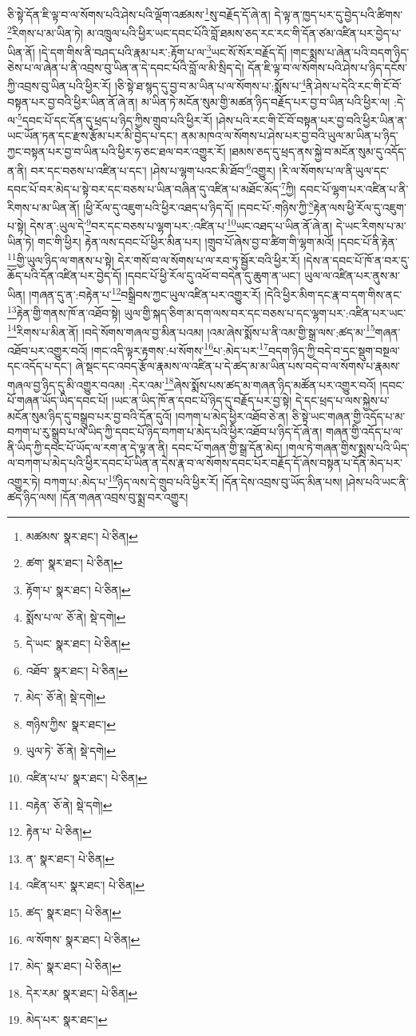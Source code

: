 ཅི་སྟེ་དོན་ཇི་ལྟ་བ་ལ་སོགས་པའི་ཤེས་པའི་ལྡོག་འཚམས་\footnote{མཚམས་  སྣར་ཐང་།  པེ་ཅིན། }སུ་བརྗོད་དོ་ཞེ་ན། དེ་ལྟ་ན་ཁྱད་པར་དུ་བྱེད་པའི་ཚིགས་\footnote{ཚག་  སྣར་ཐང་།  པེ་ཅིན། }རིགས་པ་མ་ཡིན་ཏེ། མ་འཁྲུལ་པའི་ཕྱིར་ཡང་དབང་པོའི་བློ་ཐམས་ཅད་རང་རང་གི་དོན་ཙམ་འཛིན་པར་བྱེད་པ་ཡིན་ནོ། །དེ་དག་གིས་ནི་བཤད་པའི་རྣམ་པར་:རྟོག་པ་ལ་\footnote{རྟོག་པ་  སྣར་ཐང་།  པེ་ཅིན། }ཡང་སོ་སོར་བརྗོད་དོ། །གང་སྨྲས་པ་ཞེན་པའི་བདག་ཉིད་ཅེས་པ་ལ་ཞེན་པ་ནི་འབྲས་བུ་ཡིན་ན་དེ་དབང་པོའི་བློ་ལ་མི་སྲིད་དེ། དོན་ཇི་ལྟ་བ་ལ་སོགས་པའི་ཤེས་པ་ཉིད་དངོས་ཀྱི་འབྲས་བུ་ཡིན་པའི་ཕྱིར་རོ། །ཅི་སྟེ་ཐ་སྙད་དུ་བྱ་བ་མ་ཡིན་པ་ལ་སོགས་པ་:སྨོས་པ་\footnote{སྨོས་པ་ལ་  ཅོ་ནེ།  སྡེ་དགེ། }ནི་ཤེས་པ་དེའི་རང་གི་ངོ་བོ་བསྟན་པར་བྱ་བའི་ཕྱིར་ཡིན་ནོ་ཞེ་ན། མ་ཡིན་ཏེ་མངོན་སུམ་གྱི་མཚན་ཉིད་བརྗོད་པར་བྱ་བ་ཡིན་པའི་ཕྱིར་ལ། :དེ་ལ་\footnote{དེ་ཡང་  སྣར་ཐང་།  པེ་ཅིན། }དབང་པོ་དང་དོན་དུ་ཕྲད་པ་ཉིད་ཀྱིས་གྲུབ་པའི་ཕྱིར་རོ། །ཤེས་པའི་རང་གི་ངོ་བོ་བསྟན་པར་བྱ་བའི་ཕྱིར་ཡིན་ན་ཡང་ཡོན་ཏན་དང་རྫས་རྩོམ་པར་མི་བྱེད་པ་དང་། ནམ་མཁའ་ལ་སོགས་པ་ཤེས་པར་བྱ་བའི་ཡུལ་མ་ཡིན་པ་ཉིད་ཀྱང་བསྟན་པར་བྱ་བ་ཡིན་པའི་ཕྱིར་ཧ་ཅང་ཐལ་བར་འགྱུར་རོ། །ཐམས་ཅད་དུ་ཕྲད་ནས་སྐྱེ་བ་མངོན་སུམ་དུ་འདོད་ན་ནི། བར་དང་བཅས་པ་འཛིན་པ་དང་། །ཤེས་པ་ལྷག་པའང་མི་ཐོབ་\footnote{འཐོབ་  སྣར་ཐང་།  པེ་ཅིན། }འགྱུར། །རི་ལ་སོགས་པ་ལ་ནི་ཡུལ་དང་དབང་པོ་བར་མེད་པ་སྟེ་བར་དང་བཅས་པ་ཡིན་བཞིན་དུ་འཛིན་པ་མཐོང་མོད་\footnote{མེད་  ཅོ་ནེ།  སྡེ་དགེ། }ཀྱི། དབང་པོ་ལྷག་པར་འཛིན་པ་ནི་རིགས་པ་མ་ཡིན་ནོ། །ཕྱི་རོལ་དུ་འཇུག་པའི་ཕྱིར་འཐད་པ་ཉིད་དོ། །དབང་པོ་:གཉིས་ཀྱི་\footnote{གཉིས་ཀྱིས་  སྣར་ཐང་། }རྟེན་ལས་ཕྱི་རོལ་དུ་འཇུག་པ་སྟེ། དེས་ན་:ཡུལ་དེ་\footnote{ཡུལ་ཏེ་  ཅོ་ནེ།  སྡེ་དགེ། }བར་དང་བཅས་པ་ལྷག་པར་:འཛིན་པ་\footnote{འཛིན་པ་པ་  སྣར་ཐང་།  པེ་ཅིན། }ཡང་འཐད་པ་ཡིན་ནོ་ཞེ་ན། དེ་ཡང་རིགས་པ་མ་ཡིན་ཏེ། གང་གི་ཕྱིར། རྟེན་ལས་དབང་པོ་ཕྱིར་མིན་པར། །གྲུབ་པོ་ཞེས་བྱ་བ་ཚིག་གི་ལྷག་མའོ། །དབང་པོ་ནི་རྟེན་\footnote{བརྟེན་  ཅོ་ནེ།  སྡེ་དགེ། }གྱི་ཡུལ་ཉིད་ལ་གནས་པ་སྟེ། དེར་གསོ་བ་ལ་སོགས་པ་ལ་རབ་ཏུ་སྦྱོར་བའི་ཕྱིར་རོ། །དེས་ན་དབང་པོ་ཁོ་ན་བར་དུ་ཆོད་པའི་དོན་འཛིན་པར་བྱེད་དོ། །དབང་པོ་ཕྱི་རོལ་དུ་འཕོ་བ་བདེན་དུ་ཆུག་ན་ཡང་། ཡུལ་ལ་འཛིན་པར་ནུས་མ་ཡིན། །གཞན་དུ་ན་:བརྟེན་པ་\footnote{རྟེན་པ་  པེ་ཅིན། }བསྒྲིབས་ཀྱང་ཡུལ་འཛིན་པར་འགྱུར་རོ། །དེའི་ཕྱིར་མིག་དང་རྣ་བ་དག་གིས་ནང་\footnote{ན་  སྣར་ཐང་།  པེ་ཅིན། }རྟེན་གྱི་གནས་ཁོ་ན་འཐོབ་སྟེ། ཡུལ་གྱི་སྐད་ཅིག་མ་དག་ལས་བར་དང་བཅས་པ་དང་ལྷག་པར་:འཛིན་པར་ཡང་\footnote{འཛིན་པར་  སྣར་ཐང་།  པེ་ཅིན། }རིགས་པ་མིན་ནོ། །བདེ་སོགས་གཞལ་བྱ་མིན་པའམ། །འམ་ཞེས་སྨོས་པ་ནི་འམ་གྱི་སྒྲ་ལས་:ཚད་མ་\footnote{ཚད་  སྣར་ཐང་།  པེ་ཅིན། }གཞན་འཐོབ་པར་འགྱུར་བའོ། །གང་འདི་ལྟར་རྟགས་:པ་སོགས་\footnote{ལ་སོགས་  སྣར་ཐང་།  པེ་ཅིན། }པ་:མེད་པར་\footnote{མེད་  སྣར་ཐང་།  པེ་ཅིན། }བདག་ཉིད་ཀྱི་བདེ་བ་དང་སྡུག་བསྔལ་དང་འདོད་པ་དང་། ཞེ་སྡང་དང་འབད་རྩོལ་རྣམས་ལ་འཛིན་པ་དེ་ཚད་མ་མ་ཡིན་པས་བདེ་བ་ལ་སོགས་པ་རྣམས་གཞལ་བྱ་ཉིད་དུ་མི་འགྱུར་བའམ། :དེར་འམ་\footnote{དེར་རམ་  སྣར་ཐང་།  པེ་ཅིན། }ཞེས་སྨོས་པས་ཚད་མ་གཞན་ཉིད་མཚོན་པར་འགྱུར་བའོ། །དབང་པོ་གཞན་ཡོད་ཡིད་དབང་པོ། །ཡང་ན་ཡིད་ཁོ་ན་དབང་པོ་ཉིད་དུ་བརྗོད་པར་བྱ་སྟེ། དེ་དང་ཕྲད་པ་ལས་སྐྱེས་པ་མངོན་སུམ་ཉིད་དུ་བསྒྲུབ་པར་བྱ་བའི་དོན་དུའོ། །བཀག་པ་མེད་ཕྱིར་འཐོབ་ཅེ་ན། ཅི་སྟེ་ཡང་གཞན་གྱི་འདོད་པ་མ་བཀག་པ་རུ་སྒྲུབ་པ་ལ་ཡིད་ཀྱི་དབང་པོ་ཉིད་བཀག་པ་མེད་པའི་ཕྱིར་འཐོབ་པ་ཉིད་དོ་ཞེ་ན། གཞན་གྱི་འདོད་པ་ལ་ནི་ཡིད་ཀྱི་དབང་པོ་ཡོད་ལ་རག་ན་དེ་ལྟ་ན་ནི། དབང་པོ་གཞན་གྱི་སྒྲ་དོན་མེད། །གལ་ཏེ་གཞན་གྱིས་སྨྲས་པའི་ཡིད་ལ་བཀག་པ་མེད་པའི་ཕྱིར་དབང་པོ་ཡིན་ན་དེས་རྣ་བ་ལ་སོགས་དབང་པོར་བརྗོད་དོ་ཞེས་བསྟན་པ་དོན་མེད་པར་འགྱུར་ཏེ། བཀག་པ་:མེད་པ་\footnote{མེད་པར་  སྣར་ཐང་། }ཉིད་ལས་དེ་གྲུབ་པའི་ཕྱིར་རོ། །དོན་དེས་འབྲས་བུ་ཡོད་མིན་པས། །ཤེས་པའི་ཡང་ནི་ཚད་ཉིད་ལས། །དོན་གཞན་འབྲས་བུ་སྨྲ་བར་འགྱུར། 
